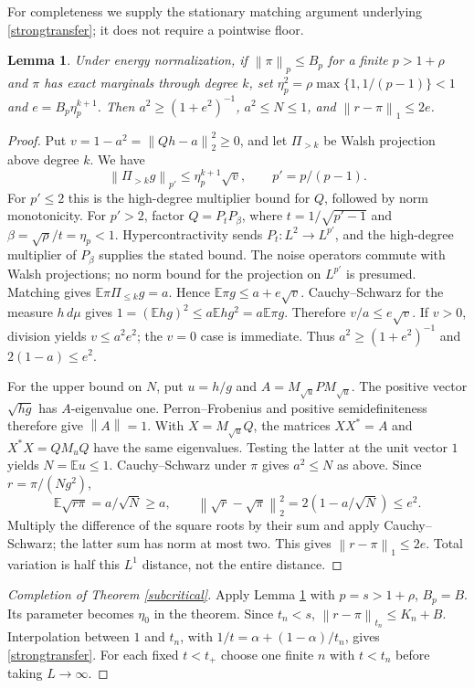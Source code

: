 \documentclass[11pt]{article}
\newcommand{\E}{\mathbb E}
\newcommand{\norm}[1]{\left\|#1\right\|}
\newtheorem{lemma}[theorem]{Lemma}
\begin{document}
For completeness we supply the stationary matching argument underlying \eqref{strongtransfer}; it does not require a pointwise floor.
\begin{lemma}\label{rigidity}
Under energy normalization, if $\norm\pi_p\leq B_p$ for a finite $p>1+\rho$ and $\pi$ has exact marginals through degree $k$, set
$\eta_p^2=\rho\max\{1,1/(p-1)\}<1$ and $e=B_p\eta_p^{k+1}$.
Then $a^2\geq(1+e^2)^{-1}$, $a^2\leq N\leq1$, and $\norm{r-\pi}_1\leq2e$.
\end{lemma}
\begin{proof}
Put $v=1-a^2=\norm{Qh-a}_2^2\geq0$, and let $\Pi_{>k}$ be Walsh projection above degree $k$. We have
\[
 \norm{\Pi_{>k}g}_{p'}\leq\eta_p^{k+1}\sqrt v,\qquad p'=p/(p-1).
\]
For $p'\leq2$ this is the high-degree multiplier bound for $Q$, followed by norm monotonicity. For $p'>2$, factor $Q=P_tP_\beta$, where $t=1/\sqrt{p'-1}$ and $\beta=\sqrt\rho/t=\eta_p<1$. Hypercontractivity sends $P_t:L^2\to L^{p'}$, and the high-degree multiplier of $P_\beta$ supplies the stated bound. The noise operators commute with Walsh projections; no norm bound for the projection on $L^{p'}$ is presumed.
Matching gives $\E\pi\Pi_{\leq k}g=a$. Hence $\E\pi g\leq a+e\sqrt v$. Cauchy--Schwarz for the measure $h\,d\mu$ gives
$1=(\E hg)^2\leq a\E hg^2=a\E\pi g$. Therefore $v/a\leq e\sqrt v$. If $v>0$, division yields $v\leq a^2e^2$; the $v=0$ case is immediate. Thus $a^2\geq(1+e^2)^{-1}$ and $2(1-a)\leq e^2$.

For the upper bound on $N$, put $u=h/g$ and $A=M_{\sqrt u}PM_{\sqrt u}$. The positive vector $\sqrt{hg}$ has $A$-eigenvalue one. Perron--Frobenius and positive semidefiniteness therefore give $\norm A=1$. With $X=M_{\sqrt u}Q$, the matrices $XX^*=A$ and $X^*X=QM_uQ$ have the same eigenvalues. Testing the latter at the unit vector $1$ yields $N=\E u\leq1$. Cauchy--Schwarz under $\pi$ gives $a^2\leq N$ as above. Since $r=\pi/(Ng^2)$,
\[
 \E\sqrt{r\pi}=a/\sqrt N\geq a,\qquad
 \norm{\sqrt r-\sqrt\pi}_2^2=2(1-a/\sqrt N)\leq e^2.
\]
Multiply the difference of the square roots by their sum and apply Cauchy--Schwarz; the latter sum has norm at most two. This gives $\norm{r-\pi}_1\leq2e$. Total variation is half this $L^1$ distance, not the entire distance.
\end{proof}

\begin{proof}[Completion of Theorem \ref{subcritical}]
Apply Lemma \ref{rigidity} with $p=s>1+\rho$, $B_p=B$. Its parameter becomes $\eta_0$ in the theorem. Since $t_n<s$, $\norm{r-\pi}_{t_n}\leq K_n+B$. Interpolation between $1$ and $t_n$, with $1/t=\alpha+(1-\alpha)/t_n$, gives \eqref{strongtransfer}. For each fixed $t<t_+$ choose one finite $n$ with $t<t_n$ before taking $L\to\infty$.
\end{proof}
\end{document}
